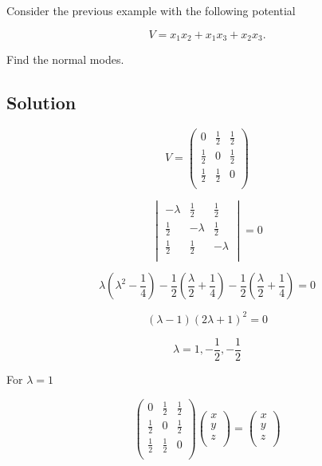 \documentclass[12pt]{article}
\begin{document}
Consider the previous example with the following potential

\[
    V=x_1 x_2+x_1 x_3+x_2 x_3 .
\]

Find the normal modes.

\subsection{Solution}

\[
    V = \begin{pmatrix}
        0           & \frac{1}{2} & \frac{1}{2} \\
        \frac{1}{2} & 0           & \frac{1}{2} \\
        \frac{1}{2} & \frac{1}{2} & 0           \\
    \end{pmatrix}
\]

\[
    \begin{vmatrix}
        -\lambda    & \frac{1}{2} & \frac{1}{2} \\
        \frac{1}{2} & -\lambda    & \frac{1}{2} \\
        \frac{1}{2} & \frac{1}{2} & -\lambda    \\
    \end{vmatrix} = 0
\]

\[
    \lambda \left( \lambda^2 - \frac{1}{4} \right)
    - \frac{1}{2} \left( \frac{\lambda}{2} + \frac{1}{4} \right)
    - \frac{1}{2} \left( \frac{\lambda}{2} + \frac{1}{4} \right) = 0
\]

\[
    \left(\lambda-1\right) {\left(2\lambda+1\right) }^2 = 0
\]

\[
    \lambda = 1, -\frac{1}{2}, -\frac{1}{2}
\]

For \(\lambda = 1\)

\[
    \begin{pmatrix}
        0           & \frac{1}{2} & \frac{1}{2} \\
        \frac{1}{2} & 0           & \frac{1}{2} \\
        \frac{1}{2} & \frac{1}{2} & 0           \\
    \end{pmatrix} \begin{pmatrix}
        x \\
        y \\
        z \\
    \end{pmatrix} = \begin{pmatrix}
        x \\
        y \\
        z \\
    \end{pmatrix}
\]
\end{document}
